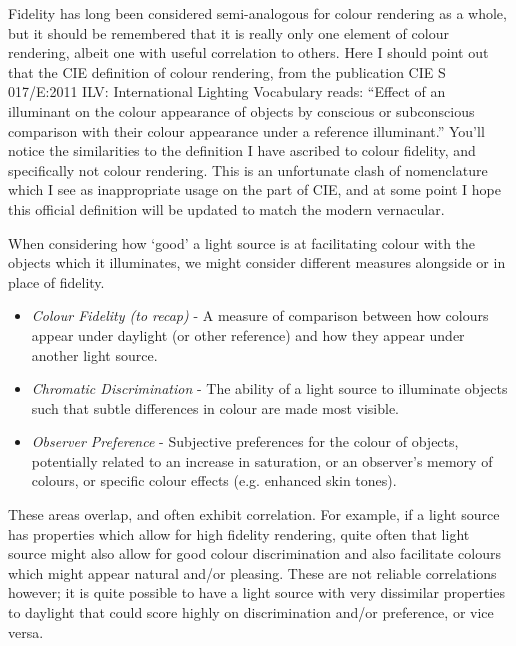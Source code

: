 Fidelity has long been considered semi-analogous for colour rendering as a whole, but it should be remembered that it is really only one element of colour rendering, albeit one with useful correlation to others. Here I should point out that the CIE definition of colour rendering, from the publication CIE S 017/E:2011 ILV: International Lighting Vocabulary \citep{noauthor_cie_2011} reads: ``Effect of an illuminant on the colour appearance of objects by conscious or subconscious comparison with their colour appearance under a reference illuminant.'' You'll notice the similarities to the definition I have ascribed to colour fidelity, and specifically not colour rendering. This is an unfortunate clash of nomenclature which I see as inappropriate usage on the part of CIE, and at some point I hope this official definition will be updated to match the modern vernacular.

When considering how `good' a light source is at facilitating colour with the objects which it illuminates, we might consider different measures alongside or in place of fidelity.

\begin{itemize}
\item \emph{Colour Fidelity (to recap)} - A measure of comparison between how colours appear under daylight (or other reference) and how they appear under another light source. %
\item \emph{Chromatic Discrimination} - The ability of a light source to illuminate objects such that subtle differences in colour are made most visible. %
\item \emph{Observer Preference} - Subjective preferences for the colour of objects, potentially related to an increase in saturation, or an observer's memory of colours, or specific colour effects (e.g. enhanced skin tones). %
\end{itemize}

These areas overlap, and often exhibit correlation. For example, if a light source has properties which allow for high fidelity rendering, quite often that light source might also allow for good colour discrimination and also facilitate colours which might appear natural and/or pleasing. These are not reliable correlations however; it is quite possible to have a light source with very dissimilar properties to daylight that could score highly on discrimination and/or preference, or vice versa.

